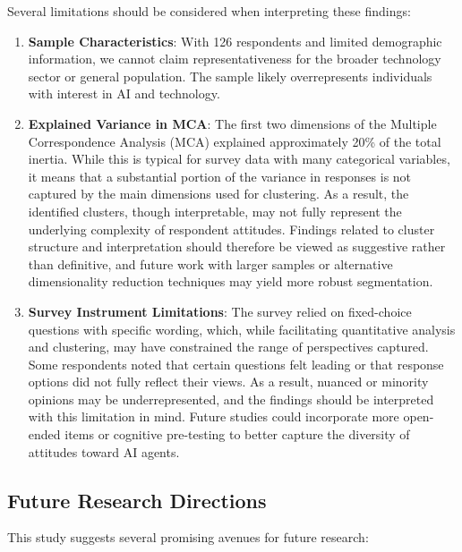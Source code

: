 \documentclass{article}
\providecommand{\tightlist}{%
  \setlength{\itemsep}{0pt}%
  \setlength{\parskip}{0pt}}
\begin{document}
Several limitations should be considered when interpreting these
findings:

\begin{enumerate}
\tightlist
\def\labelenumi{\arabic{enumi}.}
\item
  \textbf{Sample Characteristics}: With 126 respondents and limited
  demographic information, we cannot claim representativeness for the
  broader technology sector or general population. The sample likely
  overrepresents individuals with interest in AI and technology.
\item
  \textbf{Explained Variance in MCA}: The first two dimensions of the
  Multiple Correspondence Analysis (MCA) explained approximately 20\% of
  the total inertia. While this is typical for survey data with many
  categorical variables, it means that a substantial portion of the
  variance in responses is not captured by the main dimensions used for
  clustering. As a result, the identified clusters, though
  interpretable, may not fully represent the underlying complexity of
  respondent attitudes. Findings related to cluster structure and
  interpretation should therefore be viewed as suggestive rather than
  definitive, and future work with larger samples or alternative
  dimensionality reduction techniques may yield more robust
  segmentation.
\item
  \textbf{Survey Instrument Limitations}: The survey relied on
  fixed-choice questions with specific wording, which, while
  facilitating quantitative analysis and clustering, may have
  constrained the range of perspectives captured. Some respondents noted
  that certain questions felt leading or that response options did not
  fully reflect their views. As a result, nuanced or minority opinions
  may be underrepresented, and the findings should be interpreted with
  this limitation in mind. Future studies could incorporate more
  open-ended items or cognitive pre-testing to better capture the
  diversity of attitudes toward AI agents.
\end{enumerate}

\subsection{Future Research
Directions}\label{future-research-directions}

This study suggests several promising avenues for future research:
\end{document}
